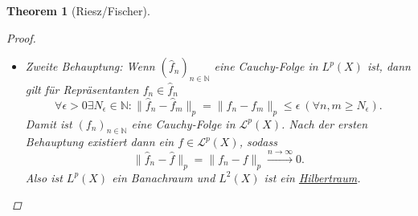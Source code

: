 \documentclass[a4paper]{scrreprt}
\newcommand{\N}{\mathbb{N}}
\newcommand{\Leb}{\mathcal{L}}
\newcommand{\jhyperref}[2]{\hyperref[j_#1]{#2}}
\newcommand{\jlink}[1]{\jhyperref{#1}{#1}}
\theoremstyle{plain}
\newtheorem{thm}{Theorem}[chapter]
\theoremstyle{definition}
\begin{document}
{{{{\begin{thm}[Riesz/Fischer]
    \begin{proof}
        \begin{itemize}
            \item[1)]
                Zweite Behauptung: Wenn $(\hat{f}_n)_{n\in\N}$ eine Cauchy-Folge in $L^p(X)$ ist, dann gilt für Repräsentanten $f_n\in \hat{f}_n$
                \[
                    \forall \epsilon > 0 \exists N_\epsilon \in \N: \lVert \hat{f}_n - \hat{f}_m \rVert_p = \lVert f_n - f_m \rVert_p \le \epsilon\ (\forall n,m\ge N_\epsilon).
                \]
                Damit ist $(f_n)_{n\in\N}$ eine Cauchy-Folge in $\Leb^p(X)$. Nach der ersten Behauptung existiert dann ein $f\in\Leb^p(X)$, sodass
                \[
                    \lVert \hat{f}_n - \hat{f} \rVert_p = \lVert f_n - f \rVert_p \xrightarrow{n\to \infty} 0.
                \]
                Also ist $L^p(X)$ ein Banachraum und $L^2(X)$ ist ein \jlink{Hilbertraum}.
                

\end{itemize}
\end{proof}
\end{thm}}}}}
\end{document}
